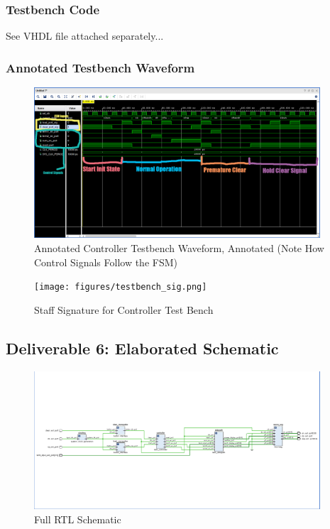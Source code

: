 \documentclass[10pt]{article}
\begin{document}
\subsubsection{Testbench Code}
See VHDL file attached separately...

\subsubsection{Annotated Testbench Waveform}

\begin{figure} [H]
  \center
  \includegraphics[width=0.95\textwidth]{figures/controllor_tb_wav_annotated.png}
  \caption{Annotated Controller Testbench Waveform, Annotated (Note How Control Signals Follow the FSM)}
\end{figure}

\begin{figure} [H]
  \center
  \texttt{[image: figures/testbench\_sig.png]}
  \caption{Staff Signature for Controller Test Bench}
\end{figure}

\subsection*{Deliverable 6: Elaborated Schematic}

\begin{figure} [H]
  \center
  \includegraphics[width=0.95\textwidth]{figures/full_rtl.png}
  \caption{Full RTL Schematic}
\end{figure}
\end{document}
